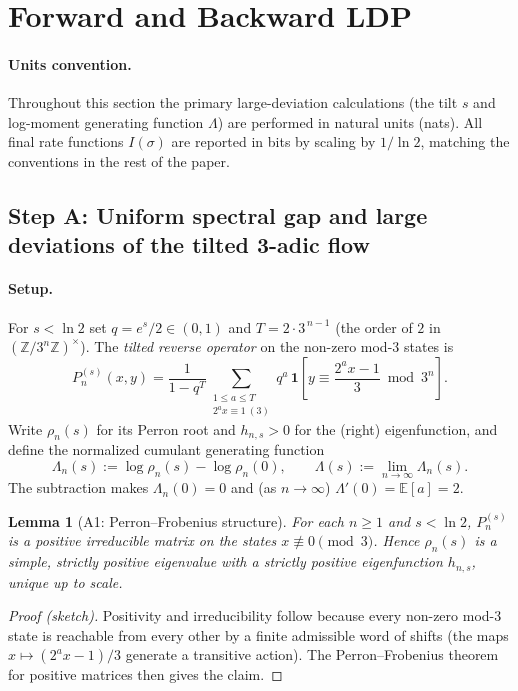 \documentclass[12pt,a4paper]{article}
\newtheorem{lemma}[theorem]{Lemma}
\begin{document}
\section{Forward and Backward LDP}

\paragraph{Units convention.} Throughout this section the primary large-deviation calculations (the tilt $s$ and log-moment generating function $\Lambda$) are performed in natural units (nats). All final rate functions $I(\sigma)$ are reported in bits by scaling by $1/\ln 2$, matching the conventions in the rest of the paper.

\subsection{Step A: Uniform spectral gap and large deviations of the tilted 3-adic flow}
\label{subsec:step_a}

\paragraph{Setup.} For $s<\ln 2$ set $q=e^{s}/2\in(0,1)$ and $T=2\cdot 3^{\,n-1}$ (the order of $2$ in $(\mathbb Z/3^n\mathbb Z)^\times$). The \emph{tilted reverse operator} on the non-zero mod-$3$ states is
\[
P_n^{(s)}(x,y)=\frac{1}{1-q^{T}}\sum_{\substack{1\le a\le T\\ 2^{a}x\equiv1\ (3)}} q^{a}\,
\mathbf 1\!\left[y\equiv\frac{2^{a}x-1}{3}\bmod 3^{n}\right].
\]
Write $\rho_n(s)$ for its Perron root and $h_{n,s}>0$ for the (right) eigenfunction, and define the normalized cumulant generating function
\[
\Lambda_n(s):=\log\rho_n(s)-\log\rho_n(0),\qquad \Lambda(s):=\lim_{n\to\infty}\Lambda_n(s).
\]
The subtraction makes $\Lambda_n(0)=0$ and (as $n\to\infty$) $\Lambda'(0)=\mathbb E[a]=2$.

\begin{lemma}[A1: Perron--Frobenius structure]
For each $n\ge1$ and $s<\ln2$, $P_n^{(s)}$ is a positive irreducible matrix on the states $x\not\equiv0\pmod3$. Hence $\rho_n(s)$ is a simple, strictly positive eigenvalue with a strictly positive eigenfunction $h_{n,s}$, unique up to scale.
\end{lemma}
\begin{proof}[Proof (sketch)]
Positivity and irreducibility follow because every non-zero mod-$3$ state is reachable from every other by a finite admissible word of shifts (the maps $x\mapsto(2^ax-1)/3$ generate a transitive action). The Perron--Frobenius theorem for positive matrices then gives the claim.
\end{proof}
\end{document}
